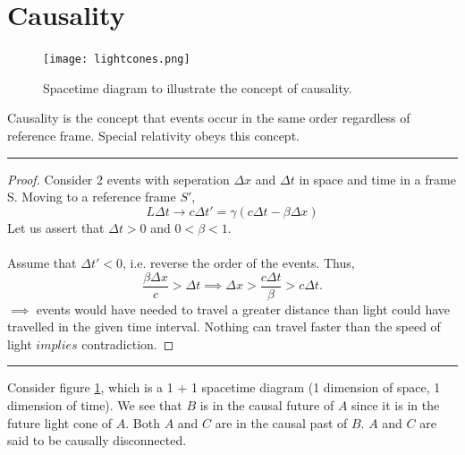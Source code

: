 \documentclass{book}
\begin{document}
\section{Causality}
\begin{figure}
	\centering
	\texttt{[image: lightcones.png]}
	\caption{Spacetime diagram to illustrate the concept of causality.}
	\label{lightcones}
\end{figure}
Causality is the concept that events occur in the same order regardless of reference frame. Special relativity obeys this concept.
\par\noindent\rule{\textwidth}{0.4pt}
\begin{proof}
	Consider 2 events with seperation $\Delta x$ and $\Delta t$ in space and time in a frame S. Moving to a reference frame $S'$,
	\begin{equation}
		L\Delta t \to c\Delta t' = \gamma \left(c\Delta t - \beta \Delta x\right)
	\end{equation}
	Let us assert that $\Delta t > 0$ and $0 < \beta < 1$.
	\\\\
	Assume that $\Delta t' < 0$, i.e. reverse the order of the events. Thus,
	\begin{equation}
		\frac{\beta \Delta x}{c} > \Delta t \implies \Delta x > \frac{c \Delta t}{\beta} > c\Delta t.
	\end{equation}
	$\implies$ events would have needed to travel a greater distance than light could have travelled in the given time interval. Nothing can travel faster than the speed of light $implies$ contradiction.
\end{proof}
\noindent\rule{\textwidth}{0.4pt}\vspace{10pt}
\noindent
Consider figure \ref{lightcones}, which is a 1 + 1 spacetime diagram (1 dimension of space, 1 dimension of time). We see that $B$ is in the causal future of $A$ since it is in the future light cone of $A$. Both $A$ and $C$ are in the causal past of $B$. $A$ and $C$ are said to be causally disconnected.
\end{document}
